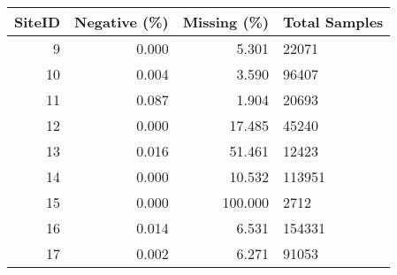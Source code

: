 \begin{tabular}{rrrl}
\toprule
 SiteID &  Negative (\%) &  Missing (\%) & Total Samples \\
\midrule
      9 &         0.000 &        5.301 &         22071 \\
     10 &         0.004 &        3.590 &         96407 \\
     11 &         0.087 &        1.904 &         20693 \\
     12 &         0.000 &       17.485 &         45240 \\
     13 &         0.016 &       51.461 &         12423 \\
     14 &         0.000 &       10.532 &        113951 \\
     15 &         0.000 &      100.000 &          2712 \\
     16 &         0.014 &        6.531 &        154331 \\
     17 &         0.002 &        6.271 &         91053 \\
\bottomrule
\end{tabular}
